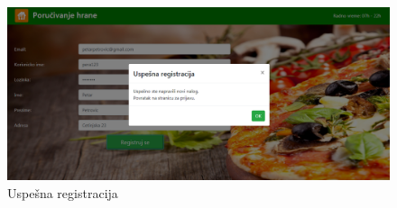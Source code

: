 \begin{figure}[!ht]
\centering
    \includegraphics[width=1\textwidth]{slike/uspesna_registracija.png}
    \caption{Uspe\v sna registracija}
    \label{fig:reg2}
\end{figure}


\newpage
